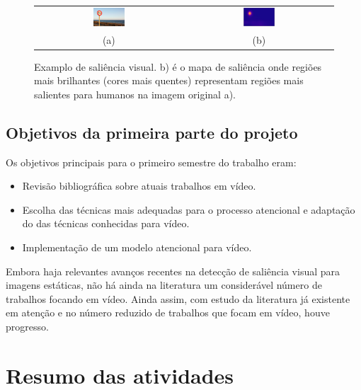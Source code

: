 \documentclass[article]{IEEEtran}
\begin{document}
\begin{center}
\begin{figure}[t]
\begin{tabular} {cc}
\includegraphics[width=0.22\textwidth]{./img/traffic_sign_s.jpg} &
\includegraphics[width=0.22\textwidth]{./img/traffic_sign_m.jpg}\\
(a) & (b)
\end{tabular}
\caption{Examplo de saliência visual.
    b) é o mapa de saliência onde regiões mais brilhantes (cores mais quentes)
    representam regiões mais salientes para humanos na imagem original a).}
\label{fig:example}
\end{figure}
\end{center}

\subsection{Objetivos da primeira parte do projeto}
Os objetivos principais para o primeiro semestre do trabalho eram:
\begin{itemize}
    \item Revisão bibliográfica sobre atuais trabalhos em vídeo.
    \item Escolha das técnicas mais adequadas para o processo atencional
        e adaptação do das técnicas conhecidas para vídeo.
    \item Implementação de um modelo atencional para vídeo.
\end{itemize}
Embora haja relevantes avanços recentes na detecção de saliência visual para
imagens estáticas, não há ainda na literatura um considerável número de
trabalhos focando em vídeo.
Ainda assim, com estudo da literatura já existente em atenção e no número
reduzido de trabalhos que focam em vídeo, houve progresso.

\section{Resumo das atividades}
\end{document}
